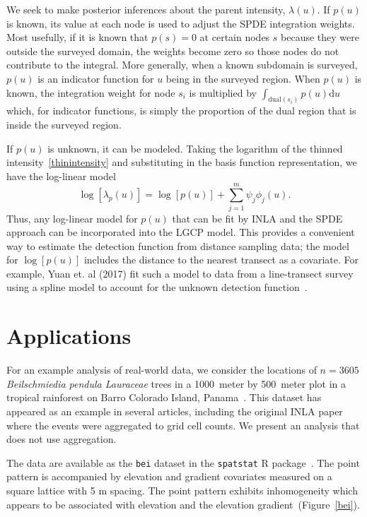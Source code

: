 \documentclass[]{interact}
\begin{document}
We seek to make posterior inferences about the parent intensity,
\(\lambda(u)\). If \(p(u)\) is known, its value at each node is used to
adjust the SPDE integration weights. Most usefully, if it is known that
\(p(s) = 0\) at certain nodes \(s\) because they were outside the surveyed
domain, the weights become zero so those nodes do not contribute to the
integral. More generally, when a known subdomain is surveyed, \(p(u)\) is
an indicator function for \(u\) being in the surveyed region. When \(p(u)\)
is known, the integration weight for node \(s_{i}\) is multiplied by
\(\int_{\mathrm{dual}(s_{i})} p(u) \mathrm{d}u\)
which, for indicator functions, is simply the proportion of the dual region
that is inside the surveyed region.

If \(p(u)\) is unknown, it can be modeled. Taking the logarithm of the thinned
intensity~\eqref{thinintensity} and substituting in the basis function
representation, we have the log-linear model
\begin{equation}
\log\left[\lambda_{p}(u)\right]
= \log\left[p(u)\right] + \sum_{j = 1}^{m} \psi_{j} \phi_{j}(u).
\end{equation}
Thus, any log-linear model for \(p(u)\) that can be fit by INLA and the SPDE
approach can be incorporated into the LGCP model. This provides a convenient
way to estimate the detection function from distance sampling data; the model
for \(\log[p(u)]\) includes the distance to the nearest transect as a
covariate. For example, Yuan et. al (2017) fit such a model to data from a
line-transect survey using a spline model to account for the unknown detection
function~\cite{yuanetal}.


\section{Applications}
\label{application}

For an example analysis of real-world data, we consider the locations of
\(n = 3605\) \emph{Beilschmiedia pendula Lauraceae} trees in a 1000~meter by
500~meter plot in a tropical rainforest on Barro Colorado Island,
Panama~\cite{moellerwaagepetersen}. This dataset has appeared as an example
in several articles, including the original INLA paper where the events were
aggregated to grid cell counts. We present an analysis that does not use
aggregation.

The data are available as the \texttt{bei} dataset in the \texttt{spatstat} R
package~\cite{spatstat}. The point pattern is accompanied by elevation and
gradient covariates measured on a square lattice with 5 m spacing. The point
pattern exhibits inhomogeneity which appears to be associated with elevation
and the elevation gradient~(Figure~\ref{bei}).
\end{document}
